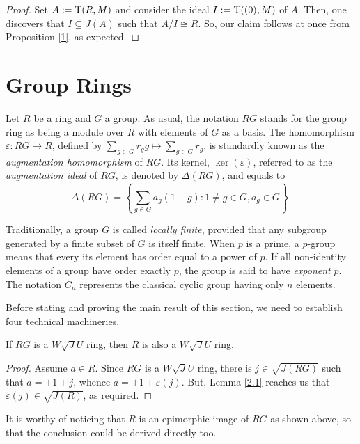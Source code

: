 \documentclass[12pt]{amsart}
\begin{document}
\begin{proof} Set $A:={\rm T}(R, M)$ and consider the ideal $I:={\rm T}((0), M)$ of $A$. Then, one discovers that $I\subseteq J(A)$ such that $A/I \cong R$. So, our claim follows at once from Proposition \ref{1}, as expected.
\end{proof}

\section{Group Rings}

Let $R$ be a ring and $G$ a group. As usual, the notation $RG$ stands for the group ring as being a module over
$R$ with elements of $G$ as a basis. The homomorphism $\varepsilon \colon RG \to R$, defined by $\sum_{g\in G} r_g g \mapsto \sum_{g\in G} r_g$, is standardly known as the \textit{augmentation homomorphism} of $RG$. Its kernel, $\ker(\varepsilon)$, referred to as the \textit{augmentation ideal} of $RG$, is denoted by $\Delta(RG)$, and equals to $$\Delta(RG)=\left\{ \sum_{g \in G}a_g(1 - g) \colon 1 \neq g \in G, a_g \in G \right\}.$$

Traditionally, a group $G$ is called \textit{locally finite}, provided that any subgroup generated by a finite
subset of $G$ is itself finite. When $p$ is a prime, a $p$-group means that every its element has order equal to a power of $p$. If all non-identity elements of a group have order exactly $p$, the group is said to have
\textit{exponent} $p$. The notation $C_n$ represents the classical cyclic group having only $n$ elements.

\medskip

Before stating and proving the main result of this section, we need to establish four technical machineries.

\begin{lemma}\label{l1} If $RG$ is a $W\sqrt{J}U$ ring, then $R$ is also a $W\sqrt{J}U$ ring. 
\end{lemma}

\begin{proof} Assume $a \in R$. Since $RG$ is a $W\sqrt{J}U$ ring, there is $j \in \sqrt{J(RG)}$ such that
$a = \pm 1 + j$, whence $a = \pm 1 + \varepsilon(j)$. But, Lemma \ref{2.1} reaches us that $\varepsilon(j) \in \sqrt{J(R)}$, as required.
\end{proof}

It is worthy of noticing that $R$ is an epimorphic image of $RG$ as shown above, so that the conclusion could be derived directly too.
\end{document}
